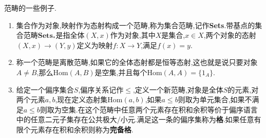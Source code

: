 范畴的一些例子.
\begin{enumerate}
	\item 集合作为对象,映射作为态射构成一个范畴,称为集合范畴,记作\textbf{Sets}.带基点的集合范畴$\textbf{Sets}_*$是指全体$(X,x)$作为对象,其中$X$是集合,$x\in X$,两个对象的态射$(X,x)\to(Y,y)$定义为映射$f:X\to Y$,满足$f(x)=y$.
	\item 称一个范畴是离散范畴,如果它的全体态射都是恒等态射,这也就是说只要对象$A\not=B$,那么$\mathrm{Hom}(A,B)$是空集,并且每个$\mathrm{Hom}(A,A)=\{1_A\}$.
	\item 给定一个偏序集合$S$,偏序关系记作$\le$,定义一个新范畴,对象是全体$S$的元素,对两个元素$a,b$,现在定义态射集$\mathrm{Hom}(a,b)$,如果$a\le b$则取为单元集合,如果不满足$a\le b$则取为空集.在这个范畴中任意两个元素存在积和余积等价于偏序语言中的任意二元子集存在公共极大/小元.满足这一条的偏序集称为\textbf{格}.如果任意有限个元素存在积和余积则称为\textbf{完备格}.
\end{enumerate}

